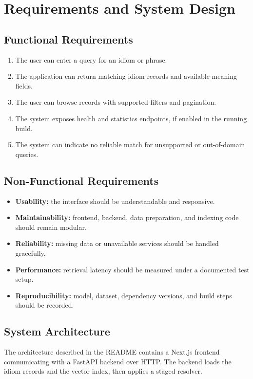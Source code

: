 \documentclass[12pt,a4paper]{report}
\begin{document}
\chapter{Requirements and System Design}

\section{Functional Requirements}
\begin{enumerate}[label=FR\arabic*.]
    \item The user can enter a query for an idiom or phrase.
    \item The application can return matching idiom records and available meaning
          fields.
    \item The user can browse records with supported filters and pagination.
    \item The system exposes health and statistics endpoints, if enabled in the
          running build.
    \item The system can indicate no reliable match for unsupported or
          out-of-domain queries.
\end{enumerate}

\section{Non-Functional Requirements}
\begin{itemize}
    \item \textbf{Usability:} the interface should be understandable and
          responsive.
    \item \textbf{Maintainability:} frontend, backend, data preparation, and
          indexing code should remain modular.
    \item \textbf{Reliability:} missing data or unavailable services should be
          handled gracefully.
    \item \textbf{Performance:} retrieval latency should be measured under a
          documented test setup.
    \item \textbf{Reproducibility:} model, dataset, dependency versions, and build
          steps should be recorded.
\end{itemize}

\section{System Architecture}
The architecture described in the README contains a Next.js frontend communicating
with a FastAPI backend over HTTP. The backend loads the idiom records and the
vector index, then applies a staged resolver.
\end{document}
